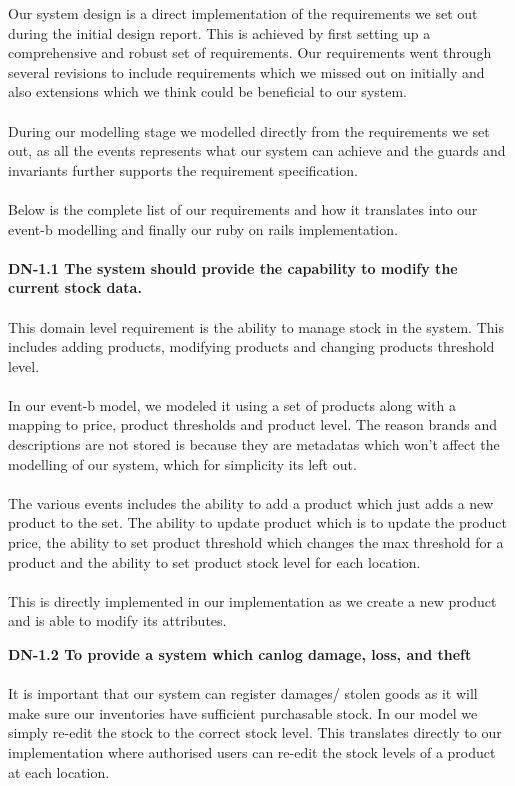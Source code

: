 \documentclass[a4paper]{article}
\begin{document}
Our system design is a direct implementation of the requirements we set out during the initial design report.  This is achieved by first setting up a comprehensive and robust set of requirements. Our requirements went through several revisions to include requirements which we missed out on initially and also extensions which we think could be beneficial to our system. 
\\\\
During our modelling stage we modelled directly from the requirements we set out, as all the events represents what our system can achieve and the guards and invariants further supports the requirement specification. 
\\\\
Below is the complete list of our requirements and how it translates into our event-b modelling and finally our ruby on rails implementation. 
\\\\
\textbf{DN-1.1 The system should provide the capability to modify the current stock data.}
\\\\
This domain level requirement is the ability to manage stock in the system. This includes adding products, modifying products and changing products threshold level. 
\\\\
In our event-b model, we modeled it using a set of products along with a mapping to price, product thresholds and product level. The reason brands and descriptions are not stored is because they are metadatas which won't affect the modelling of our system, which for simplicity its left out. 
\\\\
The various events includes the ability to add a product which just adds a new product to the set. The ability to update product which is to update the product price, the ability to set product threshold which changes the max threshold for a product and the ability to set product stock level for each location. 
\\\\
This is directly implemented in our implementation as we create a new product and is able to modify its attributes. 

\textbf{DN-1.2 To provide a system which canlog damage, loss, and theft}
\\\\
It is important that our system can register damages/ stolen goods as it will make sure our inventories have sufficient purchasable stock. In our model we simply re-edit the stock to the correct stock level. This translates directly to our implementation where authorised users can re-edit the stock levels of a product at each location. 
\end{document}
